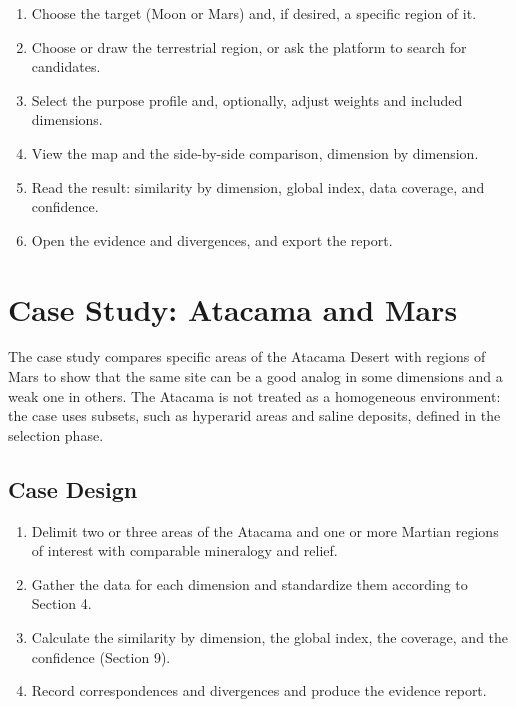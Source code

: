 \documentclass[12pt,letterpaper]{article}
\begin{document}
\begin{enumerate}
  \item Choose the target (Moon or Mars) and, if desired, a specific region of it.
  \item Choose or draw the terrestrial region, or ask the platform to search for candidates.
  \item Select the purpose profile and, optionally, adjust weights and included dimensions.
  \item View the map and the side-by-side comparison, dimension by dimension.
  \item Read the result: similarity by dimension, global index, data coverage, and confidence.
  \item Open the evidence and divergences, and export the report.
\end{enumerate}

\section{Case Study: Atacama and Mars}

The case study compares specific areas of the Atacama Desert with regions of Mars to show that the same site can be a good analog in some dimensions and a weak one in others. The Atacama is not treated as a homogeneous environment: the case uses subsets, such as hyperarid areas and saline deposits, defined in the selection phase.

\subsection{Case Design}

\begin{enumerate}
  \item Delimit two or three areas of the Atacama and one or more Martian regions of interest with comparable mineralogy and relief.
  \item Gather the data for each dimension and standardize them according to Section 4.
  \item Calculate the similarity by dimension, the global index, the coverage, and the confidence (Section 9).
  \item Record correspondences and divergences and produce the evidence report.
\end{enumerate}
\end{document}
